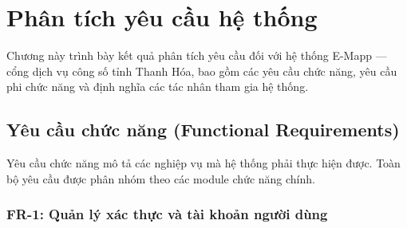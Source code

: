 
\section{Phân tích yêu cầu hệ thống}

Chương này trình bày kết quả phân tích yêu cầu đối với hệ thống E-Mapp —
cổng dịch vụ công số tỉnh Thanh Hóa, bao gồm các yêu cầu chức năng,
yêu cầu phi chức năng và định nghĩa các tác nhân tham gia hệ thống.

\subsection{Yêu cầu chức năng (Functional Requirements)}

Yêu cầu chức năng mô tả các nghiệp vụ mà hệ thống phải thực hiện được.
Toàn bộ yêu cầu được phân nhóm theo các module chức năng chính.

\subsubsection{FR-1: Quản lý xác thực và tài khoản người dùng}

